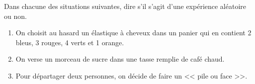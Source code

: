 Dans chacune des situations suivantes, dire s'il s'agit d'une expérience aléatoire ou non.

\begin{enumerate}
    \item On choisit au hasard un élastique à cheveux dans un panier qui en contient 2 bleus, 3 rouges, 4 verts et 1 orange.
    \item On verse un morceau de sucre dans une tasse remplie de café chaud.
    \item Pour départager deux personnes, on décide de faire un << pile ou face >>.
\end{enumerate}